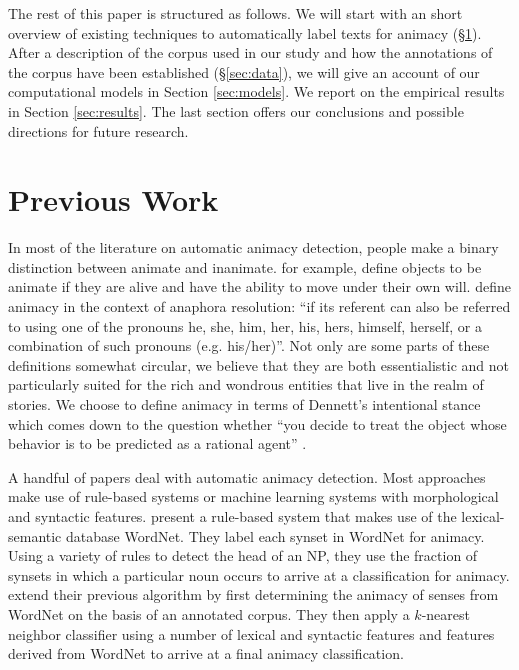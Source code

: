 \documentclass[a4paper,UKenglish]{oasics}
\begin{document}
The rest of this paper is structured as follows. We will start with an
short overview of existing techniques to automatically label texts for
animacy (\S\ref{sec:previous-work}). After a description of the corpus
used in our study and how the annotations of the corpus have been
established (\S\ref{sec:data}), we will give an account of our
computational models in Section \ref{sec:models}. We report on the
empirical results in Section \ref{sec:results}. The last section
offers our conclusions and possible directions for future research.


\section{Previous Work}\label{sec:previous-work}


In most of the literature on automatic animacy detection, people make
a binary distinction between animate and inanimate. \cite{bowman:12}
for example, define objects to be animate if they are alive and have
the ability to move under their own will. \cite{orasan:07} define
animacy in the context of anaphora resolution: ``if its referent can
also be referred to using one of the pronouns he, she, him, her, his,
hers, himself, herself, or a combination of such pronouns
(e.g. his/her)''. Not only are some parts of these definitions somewhat
circular, we believe that they are both essentialistic and not
particularly suited for the rich and wondrous entities that live in
the realm of stories. We choose to define animacy in terms of
Dennett's intentional stance which comes down to the question whether
``you decide to treat the object whose behavior is to be predicted as
a rational agent'' \cite[pp. 17]{dennett:96}.

A handful of papers deal with automatic animacy detection. Most
approaches make use of rule-based systems or machine learning systems
with morphological and syntactic features. \cite{evans:00} present a
rule-based system that makes use of the lexical-semantic database
WordNet. They label each synset in WordNet for animacy. Using a
variety of rules to detect the head of an NP, they use the fraction of
synsets in which a particular noun occurs to arrive at a
classification for animacy. \cite{orasan:01} extend their previous
algorithm by first determining the animacy of senses from WordNet on
the basis of an annotated corpus. They then apply a $k$-nearest
neighbor classifier using a number of lexical and syntactic features
and features derived from WordNet to arrive at a final animacy
classification.
\end{document}
